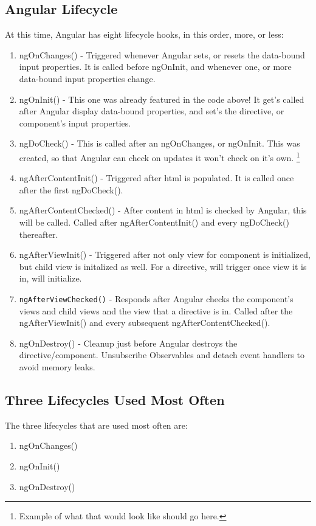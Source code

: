 \subsection{ Angular Lifecycle }
At this time, Angular has eight lifecycle hooks, in this order, more, or less:
\begin{enumerate}
  \item ngOnChanges() - Triggered whenever Angular sets, or resets the data-bound
  input properties. It is called before ngOnInit, and whenever one, or more
  data-bound input properties change.
  \item ngOnInit() - This one was already featured in the code above! It get's
  called after Angular display data-bound properties, and set's the directive,
  or component's input properties.
  \item ngDoCheck() - This is called after an ngOnChanges, or ngOnInit. This
  was created, so that Angular can check on updates it won't check on it's own.
  \footnote{Example of what that would look like should go here.}
  \item ngAfterContentInit() - Triggered after html is populated. It is called
  once after the first ngDoCheck().
  \item ngAfterContentChecked() - After content in html is checked by Angular,
  this will be called. Called after ngAfterContentInit() and every ngDoCheck()
  thereafter.
  \item ngAfterViewInit() - Triggered after not only view for component is
  initialized, but child view is initalized as well. For a directive, will
  trigger once view it is in, will initialize.
  \item \lstinline{ngAfterViewChecked()} - Responds after Angular checks the component's
  views and child views and the view that a directive is in. Called after the
  ngAfterViewInit() and every subsequent ngAfterContentChecked().
  \item ngOnDestroy() - Cleanup just before Angular destroys the
  directive/component. Unsubscribe Observables and detach event handlers to
  avoid memory leaks.
\end{enumerate}

\subsection{ Three Lifecycles Used Most Often }
The three lifecycles that are used most often are:
\begin{enumerate}
  \item ngOnChanges()
  \item ngOnInit()
  \item ngOnDestroy()
\end{enumerate}

